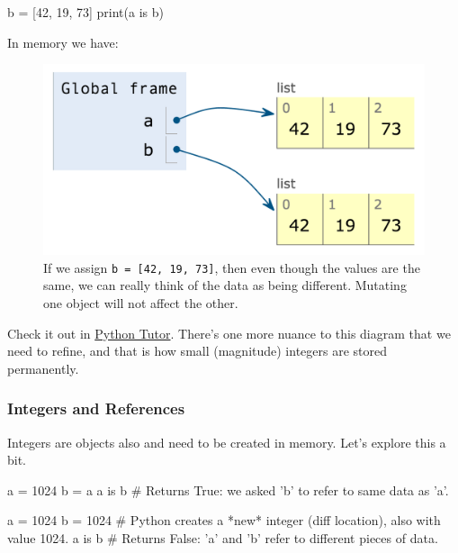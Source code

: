\documentclass[12pt,letterpaper,twoside]{article}
\begin{document}
\begin{enumerate}
\begin{python}
b = [42, 19, 73]
print(a is b)
\end{python}

In memory we have:

\begin{figure}[h]
\centering
\includegraphics[scale=0.35]{fig/list-2.png}
\caption{If we assign \texttt{b = [42, 19, 73]}, then even though the values are the same, we can really think of the data as being different. Mutating one object will not affect the other.}
\end{figure}

Check it out in
\href{http://www.pythontutor.com/visualize.html\#code=a\%20\%3D\%20\%5B42,\%2019,\%2073\%5D\%0Ab\%20\%3D\%20a\%0Aprint(a\%20is\%20b\%29\%0Ab\%20\%3D\%20\%5B42,\%2019,\%2073\%5D\%0Aprint(a\%20is\%20b\%29\%0A\&cumulative=false\&curInstr=0\&heapPrimitives=false\&mode=display\&origin=opt-frontend.js\&py=3\&rawInputLstJSON=\%5B\%5D\&textReferences=false}{Python Tutor}.
There's one more nuance to this diagram that we need to refine, and that is how small (magnitude) integers are stored permanently.

\subsubsection{Integers and References}
Integers are objects also and need to be created in memory. Let's
explore this a bit.

\begin{python}
a = 1024
b = a
a is b     # Returns True: we asked 'b' to refer to same data as 'a'.
\end{python}

\begin{python}
a = 1024   
b = 1024   # Python creates a *new* integer (diff location), also with value 1024.
a is b     # Returns False: 'a' and 'b' refer to different pieces of data.


\end{python}
\end{enumerate}
\end{document}
